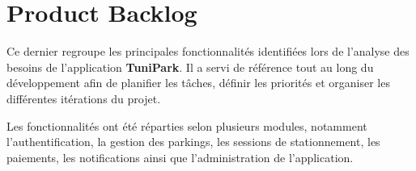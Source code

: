 \section{Product Backlog}

\par Ce dernier regroupe les principales fonctionnalités identifiées lors de l'analyse des besoins de l'application \textbf{TuniPark}. Il a servi de référence tout au long du développement afin de planifier les tâches, définir les priorités et organiser les différentes itérations du projet.

\par Les fonctionnalités ont été réparties selon plusieurs modules, notamment l'authentification, la gestion des parkings, les sessions de stationnement, les paiements, les notifications ainsi que l'administration de l'application.

\renewcommand{\arraystretch}{1.25}
\small

